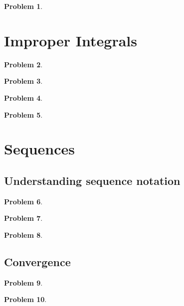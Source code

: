 \documentclass{article}
\newtheorem{problem}{Problem}
\begin{document}
\begin{problem}

\end{problem}
\section{Improper Integrals}
\begin{problem}

\end{problem}


\begin{problem}

\end{problem}
\begin{problem}

\end{problem}


\begin{problem}

\end{problem}

\section{Sequences}
\subsection{Understanding sequence notation}
\begin{problem}

\end{problem}
\begin{problem}

\end{problem}
\begin{problem}

\end{problem}

\subsection{Convergence}
\begin{problem}

\end{problem}
\begin{problem}

\end{problem}
\end{document}
